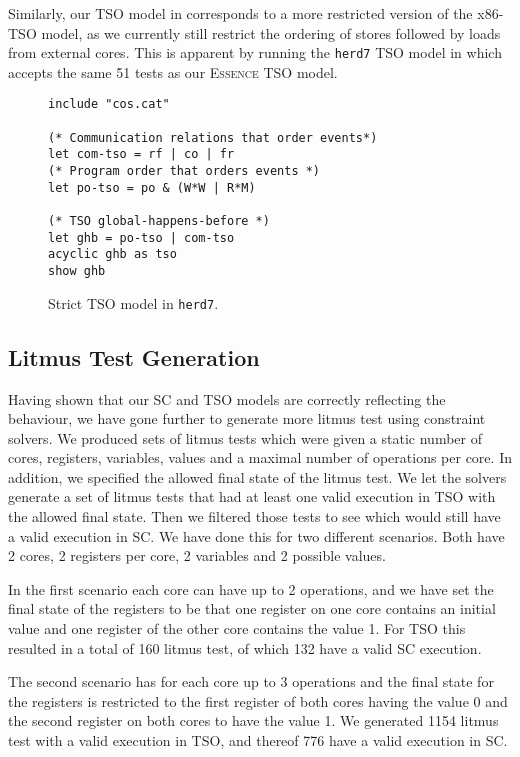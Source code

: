 \documentclass[runningheads]{llncs}
\newcommand{\essence}[0]{\textsc{Essence}}
\begin{document}
Similarly, our TSO model in  corresponds to a more restricted version of the x86-TSO model, as we currently still restrict the ordering of stores followed by loads from external cores.
This is apparent by running the {\tt{herd7}} TSO model in  which accepts the same 51 tests as our \essence{} TSO model.
\begin{figure}
\begin{lstlisting}
include "cos.cat"

(* Communication relations that order events*)
let com-tso = rf | co | fr
(* Program order that orders events *)
let po-tso = po & (W*W | R*M)

(* TSO global-happens-before *)
let ghb = po-tso | com-tso
acyclic ghb as tso
show ghb
\end{lstlisting}
\caption{Strict TSO model in {\tt{herd7}}.\label{fig:herdTSO}}
\end{figure}



\subsection{Litmus Test Generation}
Having shown that our SC and TSO models are correctly reflecting the behaviour, we have gone further to generate more litmus test using constraint solvers.
We produced sets of litmus tests which were given a static number of cores, registers, variables, values and a maximal number of operations per core.
In addition, we specified the allowed final state of the litmus test.
We let the solvers generate a set of litmus tests that had at least one valid execution in TSO with the allowed final state.
Then we filtered those tests to see which would still have a valid execution in SC.
We have done this for two different scenarios.
Both have 2 cores, 2 registers per core, 2 variables and 2 possible values.

In the first scenario each core can have up to 2 operations, and we have set the final state of the registers to be that one register on one core contains an initial value and one register of the other core contains the value 1.
For TSO this resulted in a total of 160 litmus test, of which 132 have a valid SC execution.

The second scenario has for each core up to 3 operations and the final state for the registers is restricted to the first register of both cores having the value 0 and the second register on both cores to have the value 1.
We generated 1154 litmus test with a valid execution in TSO, and thereof 776 have a valid execution in SC.
\end{document}
